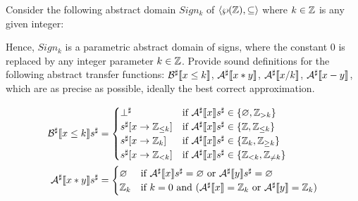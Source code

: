 \begin{exercise}{
    Consider the following abstract domain $Sign_k$ of $\left<\wp(\mathbb{Z}), \subseteq\right>$ where $k \in \mathbb{Z}$ is any given integer:
    \begin{center}
    \end{center}
    Hence, $Sign_k$ is a parametric abstract domain of signs, where the constant 0 is replaced by any integer parameter $k \in \mathbb{Z}$. Provide sound definitions for the following abstract transfer functions: $\mathcal{B}^\sharp \llbracket x \leq k \rrbracket$, $\mathcal{A}^\sharp \llbracket x * y \rrbracket$, $\mathcal{A}^\sharp \llbracket x / k \rrbracket$, $\mathcal{A}^\sharp \llbracket x - y \rrbracket$, which are as precise as possible, ideally the best correct approximation.
}
    \begin{align*}
        \mathcal{B}^\sharp \llbracket x \leq k \rrbracket s^\sharp &= \begin{cases}
            \bot^\sharp & \text{if } \mathcal{A}^\sharp \llbracket x \rrbracket s^\sharp \in \{ \varnothing, \mathbb{Z}_{>k} \} \\
            s^\sharp [x \to \mathbb{Z}_{\leq k}] & \text{if } \mathcal{A}^\sharp \llbracket x \rrbracket s^\sharp \in \{ \mathbb{Z}, \mathbb{Z}_{\leq k} \} \\
            s^\sharp [x \to \mathbb{Z}_k] & \text{if } \mathcal{A}^\sharp \llbracket x \rrbracket s^\sharp \in \{ \mathbb{Z}_k, \mathbb{Z}_{\geq k} \} \\
            s^\sharp [x \to \mathbb{Z}_{< k}] & \text{if } \mathcal{A}^\sharp \llbracket x \rrbracket s^\sharp \in \{ \mathbb{Z}_{< k}, \mathbb{Z}_{\neq k} \}
        \end{cases} \\
        \mathcal{A}^\sharp \llbracket x * y \rrbracket s^\sharp &= \begin{cases}
            \varnothing & \text{if } \mathcal{A}^\sharp \llbracket x \rrbracket s^\sharp = \varnothing \text{ or } \mathcal{A}^\sharp \llbracket y \rrbracket s^\sharp = \varnothing \\
            \mathbb{Z}_k & \text{if } k = 0 \text{ and } (\mathcal{A}^\sharp \llbracket x \rrbracket = \mathbb{Z}_k \text{ or } \mathcal{A}^\sharp \llbracket y \rrbracket = \mathbb{Z}_k) \\

\end{cases}
\end{align*}
\end{exercise}
